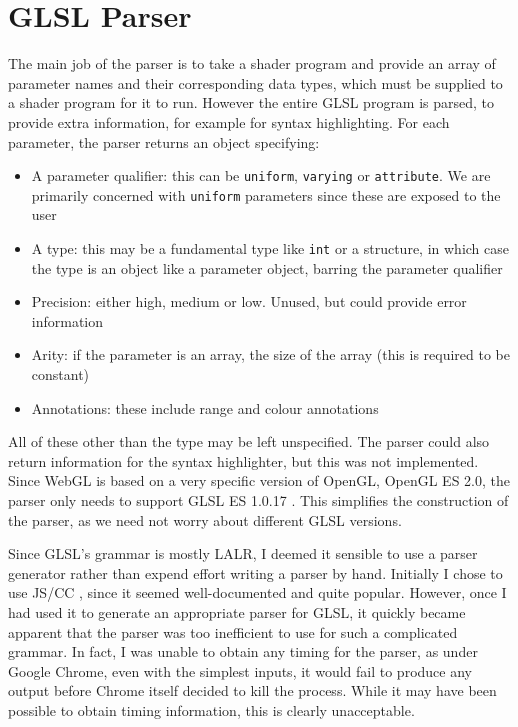 \documentclass[12pt,twoside,notitlepage]{report}
\begin{document}
\clearpage
\section{GLSL Parser}
The main job of the parser is to take a shader program and provide an array of parameter names and their corresponding data types, which must be supplied to a shader program for it to run. However the entire GLSL program is parsed, to provide extra information, for example for syntax highlighting. For each parameter, the parser returns an object specifying:
\begin{itemize}
  \item A parameter qualifier: this can be \texttt{uniform}, \texttt{varying} or \texttt{attribute}. We are primarily concerned with \texttt{uniform} parameters since these are exposed to the user
  \item A type: this may be a fundamental type like \texttt{int} or a structure, in which case the type is an object like a parameter object, barring the parameter qualifier
  \item Precision: either high, medium or low. Unused, but could provide error information
  \item Arity: if the parameter is an array, the size of the array (this is required to be constant)
  \item Annotations: these include range and colour annotations
\end{itemize}
All of these other than the type may be left unspecified. The parser could also return information for the syntax highlighter, but this was not implemented. Since WebGL is based on a very specific version of OpenGL, OpenGL ES 2.0, the parser only needs to support GLSL ES 1.0.17 \citep{glsl-spec}\citep{webgl-spec}. This simplifies the construction of the parser, as we need not worry about different GLSL versions.

Since GLSL's grammar is mostly LALR, I deemed it sensible to use a parser generator rather than expend effort writing a parser by hand. Initially I chose to use JS/CC \citep{js-cc}, since it seemed well-documented and quite popular. However, once I had used it to generate an appropriate parser for GLSL, it quickly became apparent that the parser was too inefficient to use for such a complicated grammar. In fact, I was unable to obtain any timing for the parser, as under Google Chrome, even with the simplest inputs, it would fail to produce any output before Chrome itself decided to kill the process. While it may have been possible to obtain timing information, this is clearly unacceptable. 
\end{document}
